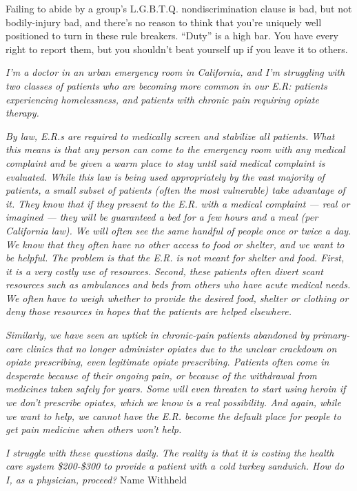 Failing to abide by a group's L.G.B.T.Q. nondiscrimination clause is
bad, but not bodily-injury bad, and there's no reason to think that
you're uniquely well positioned to turn in these rule breakers. ``Duty''
is a high bar. You have every right to report them, but you shouldn't
beat yourself up if you leave it to others.

\emph{I'm a doctor in an urban emergency room in California, and I'm
struggling with two classes of patients who are becoming more common in
our E.R: patients experiencing homelessness, and patients with chronic
pain requiring opiate therapy.}

\emph{By law, E.R.s are required to medically screen and stabilize all
patients. What this means is that any person can come to the emergency
room with any medical complaint and be given a warm place to stay until
said medical complaint is evaluated. While this law is being used
appropriately by the vast majority of patients, a small subset of
patients (often the most vulnerable) take advantage of it. They know
that if they present to the E.R. with a medical complaint --- real or
imagined --- they will be guaranteed a bed for a few hours and a meal
(per California law). We will often see the same handful of people once
or twice a day. We know that they often have no other access to food or
shelter, and we want to be helpful. The problem is that the E.R. is not
meant for shelter and food. First, it is a very costly use of resources.
Second, these patients often divert scant resources such as ambulances
and beds from others who have acute medical needs. We often have to
weigh whether to provide the desired food, shelter or clothing or deny
those resources in hopes that the patients are helped elsewhere.}

\emph{Similarly, we have seen an uptick in chronic-pain patients
abandoned by primary-care clinics that no longer administer opiates due
to the unclear crackdown on opiate prescribing, even legitimate opiate
prescribing. Patients often come in desperate because of their ongoing
pain, or because of the withdrawal from medicines taken safely for
years. Some will even threaten to start using heroin if we don't
prescribe opiates, which we know is a real possibility. And again, while
we want to help, we cannot have the E.R. become the default place for
people to get pain medicine when others won't help.}

\emph{I struggle with these questions daily. The reality is that it is
costing the health care system \$200-\$300 to provide a patient with a
cold turkey sandwich. How do I, as a physician, proceed?} Name Withheld


